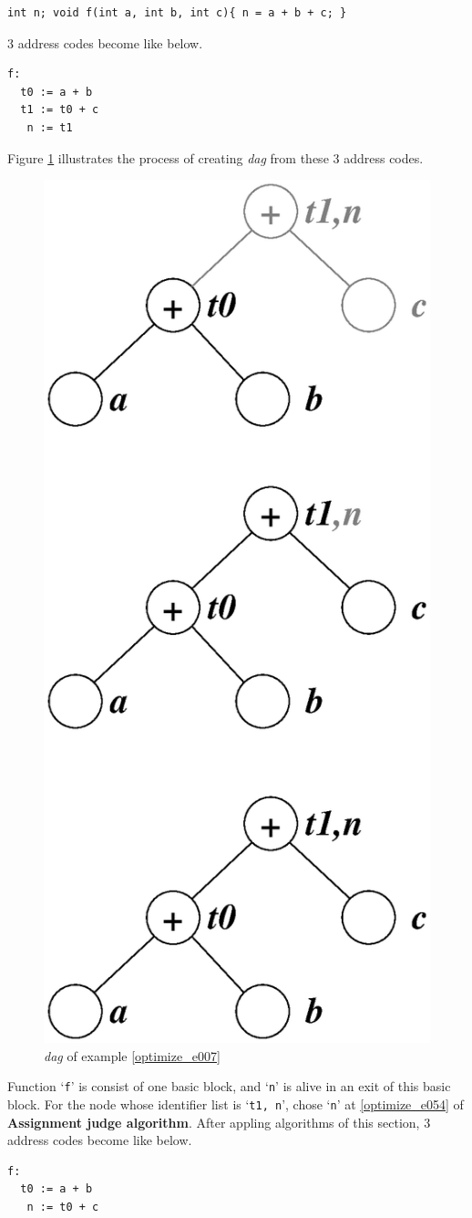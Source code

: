 \begin{Example}
\label{optimize_e007}
\begin{verbatim}
int n; void f(int a, int b, int c){ n = a + b + c; }
\end{verbatim}
3 address codes become like below.
\begin{verbatim}
f:
  t0 := a + b
  t1 := t0 + c
   n := t1
\end{verbatim}
Figure \ref{optimize_e008} illustrates the process of creating
{\em dag} from these 3 address codes.
\begin{figure}[htbp]
\begin{center}
\includegraphics[width=0.468\linewidth,height=1.0\linewidth]{opt001.eps}
\caption{{\em dag} of example \ref{optimize_e007}}
\label{optimize_e008}
\end{center}
\end{figure}
Function `{\tt{f}}' is consist of one basic block, and 
`{\tt{n}}' is alive in an exit of this basic block.
For the node whose identifier list is `{\tt{t1, n}}',
chose `{\tt{n}}' at \ref{optimize_e054} of {\bf Assignment judge algorithm}.
After appling algorithms of this section,
3 address codes become like below.
\begin{verbatim}
f:
  t0 := a + b
   n := t0 + c
\end{verbatim}
\end{Example}

